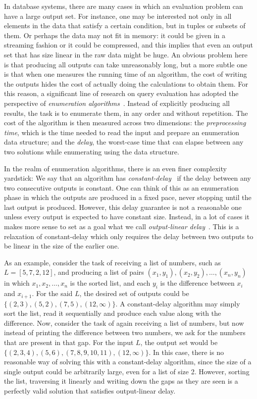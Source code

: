In database systems, there are many cases in which an evaluation problem can have a large output set. For instance, one may be interested not only in all elements in the data that satisfy a certain condition, but in tuples or subsets of them. Or perhaps the data may not fit in memory: it could be given in a streaming fashion or it could be compressed, and this implies that even an output set that has size linear in the raw data might be huge. An obvious problem here is that producing all outputs can take unreasonably long, but a more subtle one is that when one measures the running time of an algorithm, the cost of writing the outputs hides the cost of actually doing the calculations to obtain them. For this reason, a significant line of research on query evaluation has adopted the perspective of {\it enumeration algorithms}~\cite{Bagan06}. Instead of explicitly producing all results, the task is to enumerate them, in any order and without repetition. The cost of the algorithm is then measured across two dimensions: the {\it preprocessing time}, which is the time needed to read the input and prepare an enumeration data structure; and the {\it delay}, the worst-case time that can elapse between any two solutions while enumerating using the data structure.


In the realm of enumeration algorithms, there is an even finer complexity yardstick:
We say that an algorithm has {\it constant-delay}~\cite{Segoufin13} if the delay between any two consecutive outputs is constant. One can think of this as an enumeration phase in which the outputs are produced in a fixed pace, never stopping until the last output is produced. However, this delay guarantee is not a reasonable one unless every output is expected to have constant size. Instead, in a lot of cases it makes more sense to set as a goal what we call {\it output-linear delay}~\cite{FlorenzanoRUVV20}. This is a relaxation of constant-delay which only requires the delay between two outputs to be linear in the size of the earlier one.

As an example, consider the task of receiving a list of numbers, such as $L = [5, 7, 2, 12]$, and producing a list of pairs $(x_1,y_1),(x_2,y_2),\ldots,(x_n,y_n)$ in which $x_1,x_2,\ldots,x_n$ is the sorted list, and each $y_i$ is the difference between $x_i$ and $x_{i+1}$. For the said $L$, the desired set of outputs could be $\{(2,3), (5,2), (7,5),(12,\infty)\}$. A constant-delay algorithm may simply sort the list, read it sequentially and produce each value along with the difference. Now, consider the task of again receiving a list of numbers, but now instead of printing the difference between two numbers, we ask for the numbers that are present in that gap. For the input $L$, the output set would be $\{(2,3,4),(5,6),(7,8,9,10,11),(12,\infty)\}$. In this case, there is no reasonable way of solving this with a constant-delay algorithm, since the size of a single output could be arbitrarily large, even for a list of size 2. However, sorting the list, traversing it linearly and writing down the gaps as they are seen is a perfectly valid solution that satisfies output-linear delay.

